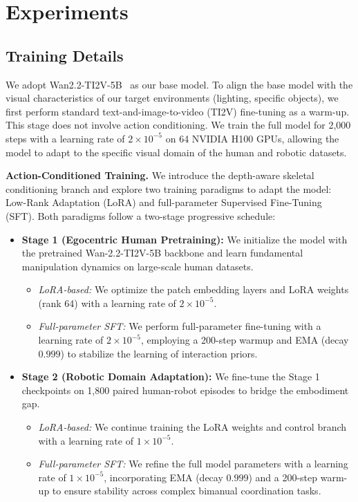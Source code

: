 

\section{Experiments}
\subsection{Training Details}


We adopt Wan2.2-TI2V-5B~\citep{wang2025wan} as our base model. To align the base model with the visual characteristics of our target environments (\eg lighting, specific objects), we first perform standard text-and-image-to-video (TI2V) fine-tuning as a warm-up. This stage does not involve action conditioning. We train the full model for 2,000 steps with a learning rate of $2 \times 10^{-5}$ on 64 NVIDIA H100 GPUs, allowing the model to adapt to the specific visual domain of the human and robotic datasets.






\noindent 
\textbf{Action-Conditioned Training.} 
We introduce the depth-aware skeletal conditioning branch and explore two training paradigms to adapt the model: Low-Rank Adaptation (LoRA) and full-parameter Supervised Fine-Tuning (SFT). Both paradigms follow a two-stage progressive schedule:
\begin{itemize}[leftmargin=*]
    \item \textbf{Stage 1 (Egocentric Human Pretraining):} We initialize the model with the pretrained Wan-2.2-TI2V-5B backbone and learn fundamental manipulation dynamics on large-scale human datasets.
    \begin{itemize}[leftmargin=*]
        \item \textit{LoRA-based:} We optimize the patch embedding layers and LoRA weights (rank 64) with a learning rate of $2 \times 10^{-5}$.
        \item \textit{Full-parameter SFT:} We perform full-parameter fine-tuning with a learning rate of $2 \times 10^{-5}$, employing a 200-step warmup and EMA (decay $0.999$) to stabilize the learning of interaction priors.
    \end{itemize}

    \item \textbf{Stage 2 (Robotic Domain Adaptation):} We fine-tune the Stage 1 checkpoints on 1,800 paired human-robot episodes to bridge the embodiment gap. 
    \begin{itemize}[leftmargin=*]
        \item \textit{LoRA-based:} We continue training the LoRA weights and control branch with a learning rate of $1 \times 10^{-5}$.
        \item \textit{Full-parameter SFT:} We refine the full model parameters with a learning rate of $1 \times 10^{-5}$, incorporating EMA (decay $0.999$) and a 200-step warm-up to ensure stability across complex bimanual coordination tasks.
    \end{itemize}
\end{itemize}

